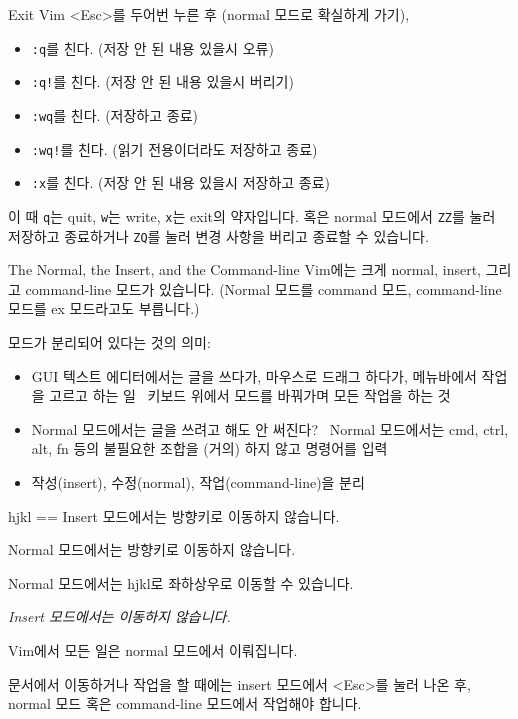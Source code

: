 \documentclass{beamer}
\begin{document}
\begin{frame}[fragile]{Exit Vim}
  <Esc>를 두어번 누른 후 (normal 모드로 확실하게 가기),\pause
  \begin{itemize}
    \item \verb/:q/를 친다. (저장 안 된 내용 있을시 오류)\pause
    \item \verb/:q!/를 친다. (저장 안 된 내용 있을시 버리기)\pause
    \item \verb/:wq/를 친다. (저장하고 종료)\pause
    \item \verb/:wq!/를 친다. (읽기 전용이더라도 저장하고 종료)\pause
    \item \verb/:x/를 친다. (저장 안 된 내용 있을시 저장하고 종료)\pause
  \end{itemize}
  이 때 \verb/q/는 \alert{q}uit, \verb/w/는 \alert{w}rite, \verb/x/는
  e\alert{x}it의 약자입니다.\pause
  혹은 normal 모드에서 \verb/ZZ/를 눌러 저장하고 종료하거나 \verb/ZQ/를 눌러
  변경 사항을 버리고 종료할 수 있습니다.
\end{frame}

\begin{frame}[fragile]{The Normal, the Insert, and the Command-line}
  Vim에는 크게 normal, insert, 그리고 command-line 모드가 있습니다.
  (Normal 모드를 command 모드, command-line 모드를 ex 모드라고도 부릅니다.)

  \pause
  모드가 분리되어 있다는 것의 의미:
  \begin{itemize}
    \item GUI 텍스트 에디터에서는 글을 쓰다가, 마우스로 드래그 하다가,
      메뉴바에서 작업을 고르고 하는 일 \pause\tra\, 키보드 위에서 모드를
      바꿔가며 모든 작업을 하는 것
    \item Normal 모드에서는 글을 쓰려고 해도 안 써진다? \pause\tra\, Normal
      모드에서는 cmd, ctrl, alt, fn 등의 불필요한 조합을 (거의) 하지 않고
      명령어를 입력\pause
    \item 작성(insert), 수정(normal), 작업(command-line)을 분리
  \end{itemize}
\end{frame}

\begin{frame}[fragile]{hjkl == \tla\tda\tua\tra}
  Insert 모드에서는 방향키로 이동하지 않습니다.\pause

  Normal 모드에서는 방향키로 이동하지 않습니다.\pause

  Normal 모드에서는 hjkl로 좌하상우로 이동할 수 있습니다.\pause

  \emph{Insert 모드에서는 이동하지 않습니다.}\pause

  \alert{\centering\large Vim에서 모든 일은 normal 모드에서 이뤄집니다.}\pause

  문서에서 이동하거나 작업을 할 때에는 insert 모드에서 <Esc>를 눌러 나온 후,
  normal 모드 혹은 command-line 모드에서 작업해야 합니다.
\end{frame}
\end{document}
